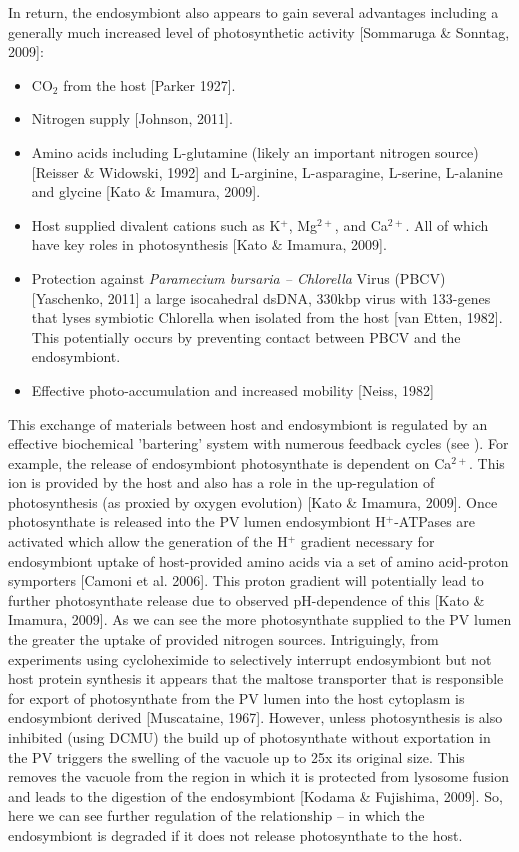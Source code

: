 \documentclass[a4paper,11pt]{article}
\begin{document}
In return, the endosymbiont also appears to gain several advantages including a generally much increased level of photosynthetic activity [Sommaruga \& Sonntag, 2009]:
\begin{itemize}
  \item CO$_{2}$ from the host [Parker 1927].
  \item Nitrogen supply [Johnson, 2011].
  \item Amino acids including L-glutamine (likely an important nitrogen source) [Reisser \& Widowski, 1992] and L-arginine, L-asparagine, L-serine, L-alanine and glycine [Kato \& Imamura, 2009].
  \item Host supplied divalent cations such as K$^{+}$, Mg$^{2+}$, and Ca$^{2+}$. All of which have key roles in photosynthesis [Kato \& Imamura, 2009].
  \item Protection against \textit{Paramecium bursaria – Chlorella} Virus (PBCV) [Yaschenko, 2011] a large isocahedral dsDNA, 330kbp virus with 133-genes that lyses symbiotic Chlorella when isolated from the host [van Etten, 1982].  This potentially occurs by preventing contact between PBCV and the endosymbiont.
  \item Effective photo-accumulation and increased mobility [Neiss, 1982]  
\end{itemize}

This exchange of materials between host and endosymbiont is regulated by an effective biochemical 'bartering' system with numerous feedback cycles (see ).
For example, the release of endosymbiont photosynthate is dependent on Ca$^{2+}$.  
This ion is provided by the host and also has a role in the up-regulation of photosynthesis (as proxied by oxygen evolution) [Kato \& Imamura, 2009].     
Once photosynthate is released into the PV lumen endosymbiont H$^{+}$-ATPases are activated which allow the generation of the H$^{+}$ gradient necessary for endosymbiont uptake of host-provided amino acids via a set of amino acid-proton symporters [Camoni et al. 2006].  
This proton gradient will potentially lead to further photosynthate release due to observed pH-dependence of this [Kato \& Imamura, 2009]. 
As we can see the more photosynthate supplied to the PV lumen the greater the uptake of provided nitrogen sources.  
Intriguingly, from experiments using cycloheximide to selectively interrupt endosymbiont but not host protein synthesis it appears that the maltose transporter that is responsible for export of photosynthate from the PV lumen into the host cytoplasm is endosymbiont derived [Muscataine, 1967]. 
However, unless photosynthesis is also inhibited (using DCMU) the build up of photosynthate without exportation in the PV triggers the swelling of the vacuole up to 25x its original size.  
This removes the vacuole from the region in which it is protected from lysosome fusion and leads to the digestion of the endosymbiont [Kodama \& Fujishima, 2009]. 
So, here we can see further regulation of the relationship – in which the endosymbiont is degraded if it does not release photosynthate to the host.
\end{document}
